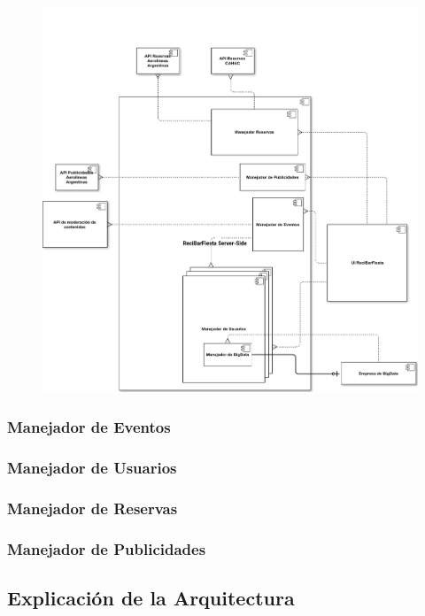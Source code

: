 \begin{figure}[H]
  \centering
  \includegraphics[width=\textwidth]{diagramas/ReciBarFiesta.png}
  \caption{\normalfont }
\end{figure} 

\subsubsection{Manejador de Eventos}

\subsubsection{Manejador de Usuarios}

\subsubsection{Manejador de Reservas}

\subsubsection{Manejador de Publicidades}

\subsection{Explicación de la Arquitectura}

